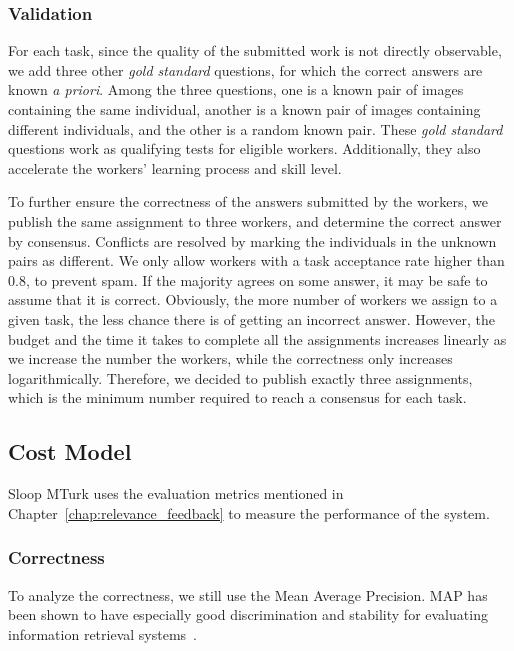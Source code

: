   \subsubsection{Validation}
  \label{subsub:validation}

  For each task, since the quality of the submitted work is not directly
  observable, we add three other \emph{gold standard} questions, for which the
  correct answers are known \emph{a priori}. Among the three questions, one is a known
  pair of images containing the same individual, another is a known pair of
  images containing different individuals, and the other is a random known pair.
  These \emph{gold standard} questions work as qualifying tests for eligible
  workers. Additionally, they also accelerate the workers' learning process and
  skill level.

  To further ensure the correctness of the answers submitted by the workers, we
  publish the same assignment to three workers, and determine the correct answer
  by consensus. Conflicts are resolved by marking the individuals in the unknown
  pairs as different. We only allow workers with a task acceptance rate higher than
  0.8, to prevent spam. If the majority agrees on some answer, it may be safe to
  assume that it is correct. Obviously, the more number of workers we assign to a
  given task, the less chance there is of getting an incorrect answer. However,
  the budget and the time it takes to complete all the assignments increases
  linearly as we increase the number the workers, while the
  correctness only increases logarithmically. Therefore, we decided to publish
  exactly three assignments, which is the minimum number required to reach a consensus
  for each task.

  \subsection{Cost Model}

  Sloop MTurk uses the evaluation metrics mentioned in
  Chapter~\ref{chap:relevance_feedback} to measure the performance of the system.

  \subsubsection{Correctness}

  To analyze the correctness, we still use the Mean Average Precision.  MAP has
  been shown to have especially good discrimination and stability for evaluating
  information retrieval
  systems~\cite{manning2008introduction}.

